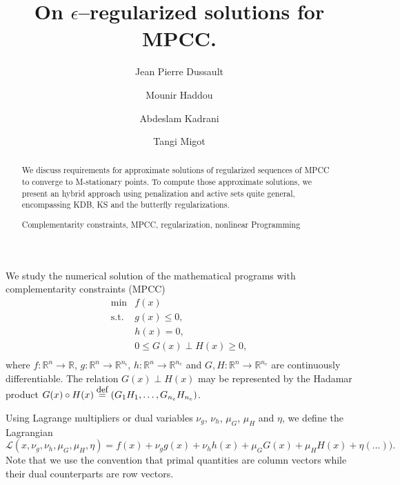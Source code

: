 \documentclass[12pt]{article}
\newcommand{\rdef}{\buildrel \mbox{\rm\small def}\over=}
\begin{document}
\title{On $\epsilon$--regularized solutions for MPCC.}


\author{Jean Pierre Dussault \and Mounir Haddou \and Abdeslam Kadrani \and Tangi Migot %
}



\maketitle

\begin{abstract}
We discuss requirements for approximate solutions of regularized sequences of MPCC to converge to M-stationary points. To compute those approximate solutions, we present an hybrid approach using penalization and active sets quite general, encompassing KDB, KS and the butterfly regularizations.

\medskip{} Complementarity constraints, MPCC, regularization, nonlinear Programming
\end{abstract}

We study the numerical solution of the mathematical programs with complementarity constraints (MPCC)
\begin{equation}\label{MPCC1}
 \begin{array}{ll} 
      \min &f(x)\\
      \textrm{s.t.}
          &g(x)\leq0,\\
          &h(x)=0,\\
          &0\leq G(x)\perp H(x)\geq0,\\
 \end{array}
\end{equation}
where  $f:{\mathbb{R}}^n\rightarrow{\mathbb{R}}$, $g:{\mathbb{R}}^n\rightarrow\mathbb{R}^{n_i}$, $h:\mathbb{R}^n\rightarrow\mathbb{R}^{n_e}$ and $G, H:\mathbb{R}^n\rightarrow\mathbb{R}^{n_c}$ are continuously differentiable. The relation $G(x)\perp H(x)$ may be represented by the Hadamar product $G(x)\circ H(x)\rdef \left(G_1H_1,\ldots,G_{n_c}H_{n_c}\right)$. 

Using Lagrange multipliers or dual variables $\nu_g$, $\nu_h$, $\mu_{G}$, $\mu_{H}$ and $\eta$, we define the Lagrangian \begin{equation}
\mathcal{L}(x,\nu_g,\nu_h,\mu_{G},\mu_{H},\eta) = f(x) + \nu_gg(x)+\nu_hh(x)+\mu_GG(x)+\mu_HH(x)+\eta(\ldots)).
\end{equation}
Note that we use the convention that primal quantities are column vectors while their dual counterparts are row vectors.
\end{document}
